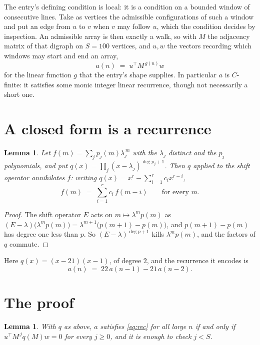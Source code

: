 \documentclass[11pt,a4paper]{article}
\theoremstyle{plain}
\newtheorem{lemma}[theorem]{Lemma}
\theoremstyle{definition}
\begin{document}
The entry's defining condition is local: it is a condition on a bounded window of consecutive lines. Take as vertices the
admissible configurations of such a window and put an edge from $u$ to $v$ when $v$ may
follow $u$, which the condition decides by inspection. An admissible array is then exactly a
walk, so with $M$ the adjacency matrix of that digraph on $S=100$ vertices, and $u,w$ the
vectors recording which windows may start and end an array,
\[
a(n)\;=\;u^{\!\top}M^{\,g(n)}w
\]
for the linear function $g$ that the entry's shape supplies. In particular $a$ is
$C$-finite: it satisfies some monic integer linear recurrence, though not necessarily a short
one.

\section{A closed form is a recurrence}

\begin{lemma}\label{lem:ann}
Let $f(m)=\sum_{j}p_j(m)\lambda_j^{\,m}$ with the $\lambda_j$ distinct and the $p_j$
polynomials, and put $q(x)=\prod_j(x-\lambda_j)^{\deg p_j+1}$. Then $q$ applied to the shift
operator annihilates $f$: writing $q(x)=x^{r}-\sum_{i=1}^{r}c_ix^{r-i}$,
\[
f(m)\;=\;\sum_{i=1}^{r}c_i\,f(m-i)\qquad\text{for every }m.
\]
\end{lemma}

\begin{proof}
The shift operator $E$ acts on $m\mapsto\lambda^{m}p(m)$ as
$(E-\lambda)\bigl(\lambda^{m}p(m)\bigr)=\lambda^{m+1}\bigl(p(m+1)-p(m)\bigr)$, and
$p(m+1)-p(m)$ has degree one less than $p$. So $(E-\lambda)^{\deg p+1}$ kills
$\lambda^{m}p(m)$, and the factors of $q$ commute.
\end{proof}

Here $q(x)=(x-21)(x-1)$, of degree $2$, and the recurrence it encodes is
\begin{equation}\label{eq:rec}
a(n)\;=\;22\,a(n-1) - 21\,a(n-2).
\end{equation}

\section{The proof}

\begin{lemma}\label{lem:crit}
With $q$ as above, $a$ satisfies \eqref{eq:rec} for all large $n$ if and only if
$u^{\!\top}M^{\,j}q(M)w=0$ for every $j\ge0$, and it is enough to check $j<S$.
\end{lemma}
\end{document}
